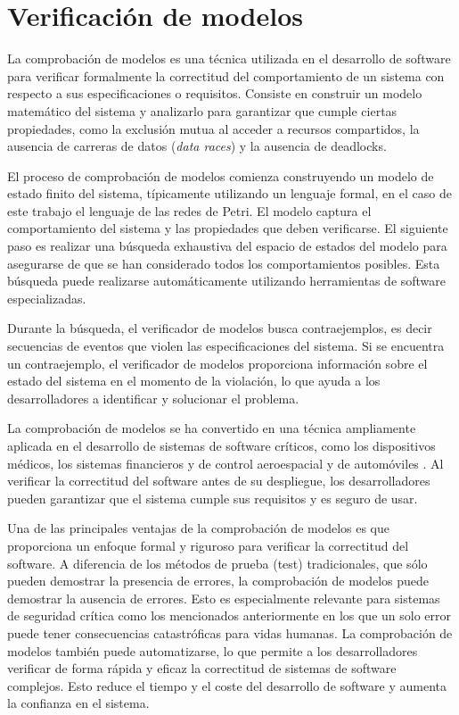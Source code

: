 \section{Verificación de modelos}

La comprobación de modelos es una técnica utilizada en el desarrollo de software para verificar
formalmente la correctitud del comportamiento de un sistema con respecto a sus
especificaciones o requisitos. Consiste en construir un modelo matemático del sistema y
analizarlo para garantizar que cumple ciertas propiedades, como la exclusión mutua al acceder
a recursos compartidos, la ausencia de carreras de datos (\textit{data races}) y la ausencia de deadlocks.

El proceso de comprobación de modelos comienza construyendo un modelo de estado finito
del sistema, típicamente utilizando un lenguaje formal, en el caso de este trabajo el lenguaje de
las redes de Petri. El modelo captura el comportamiento del sistema y las propiedades que
deben verificarse. El siguiente paso es realizar una búsqueda exhaustiva del espacio de estados
del modelo para asegurarse de que se han considerado todos los comportamientos posibles.
Esta búsqueda puede realizarse automáticamente utilizando herramientas de software
especializadas.

Durante la búsqueda, el verificador de modelos busca contraejemplos, es decir secuencias de
eventos que violen las especificaciones del sistema. Si se encuentra un contraejemplo, el
verificador de modelos proporciona información sobre el estado del sistema en el momento de
la violación, lo que ayuda a los desarrolladores a identificar y solucionar el problema.

La comprobación de modelos se ha convertido en una técnica ampliamente aplicada en el
desarrollo de sistemas de software críticos, como los dispositivos médicos,
los sistemas financieros y de control aeroespacial
\cite{carreno2005safety,monzon2009deadlock} y de automóviles \cite{Perronnet2019}.
Al verificar la correctitud del software antes de su despliegue,
los desarrolladores pueden garantizar que el sistema cumple sus requisitos y es seguro de usar.

Una de las principales ventajas de la comprobación de modelos es que proporciona un enfoque
formal y riguroso para verificar la correctitud del software. A diferencia de los métodos de
prueba (test) tradicionales, que sólo pueden demostrar la presencia de errores, la comprobación de
modelos puede demostrar la ausencia de errores. Esto es especialmente relevante para sistemas
de seguridad crítica como los mencionados anteriormente en los que un solo error puede tener
consecuencias catastróficas para vidas humanas. La comprobación de modelos también puede
automatizarse, lo que permite a los desarrolladores verificar de forma rápida y eficaz la
correctitud de sistemas de software complejos. Esto reduce el tiempo y el coste del desarrollo de
software y aumenta la confianza en el sistema.


